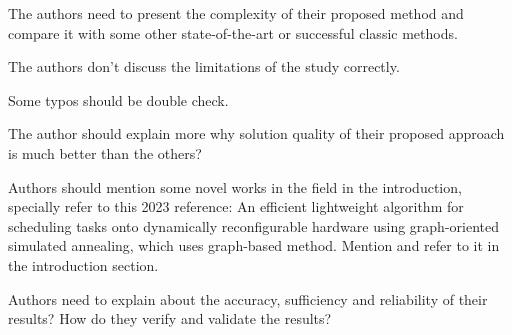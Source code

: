 \documentclass[12pt,american]{scrartcl}
\begin{document}
\begin{revcomment}
	The authors need to present the complexity of their proposed method and compare it with some other state-of-the-art or successful classic methods.
\end{revcomment}
\begin{revresponse}
	
\end{revresponse}

\begin{revcomment}
	The authors don't discuss the limitations of the study correctly.
\end{revcomment}
\begin{revresponse}
	
\end{revresponse}


\begin{revcomment}
	Some typos should be double check.
\end{revcomment}
\begin{revresponse}
	
\end{revresponse}

\begin{revcomment}
	The author should explain more why solution quality of their proposed approach is much better than the others?
\end{revcomment}
\begin{revresponse}
	
\end{revresponse}

\begin{revcomment}
	Authors should mention some novel works in the field in the introduction, specially refer to this 2023 reference: An efficient lightweight algorithm for scheduling tasks onto dynamically reconfigurable hardware using graph-oriented simulated annealing, which uses graph-based method. Mention and refer to it in the introduction section.
\end{revcomment}
\begin{revresponse}
	
\end{revresponse}

\begin{revcomment}
	Authors need to explain about the accuracy, sufficiency and reliability of their results? How do they verify and validate the results?
\end{revcomment}
\begin{revresponse}
	
\end{revresponse}



\end{document}
